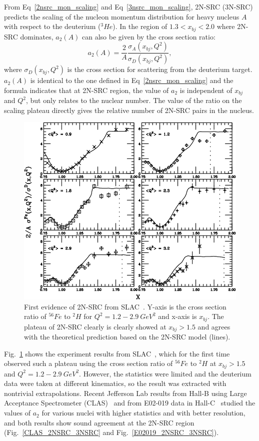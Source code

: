 From Eq~\eqref{2nsrc_mon_scaling} and Eq~\eqref{3nsrc_mon_scaling}, 2N-SRC (3N-SRC) predicts the scaling of the nucleon momentum distribution for heavy nucleus $A$ with respect to the deuterium ($^{3}He$). In the region of $1.3<x_{bj}<2.0$ where 2N-SRC dominates, $a_{2}(A)$ can also be given by the cross section ratio:
\begin{equation}
  a_{2}(A) = \frac{2}{A}\frac{\sigma_{A}(x_{bj},Q^{2})}{\sigma_{D}(x_{bj},Q^{2})},
  \label{src_a2}
\end{equation}
where $\sigma_{D}(x_{bj},Q^{2})$ is the cross section for scattering from the deuterium target. $a_{2}(A)$ is identical to the one defined in Eq~\eqref{2nsrc_mon_scaling} and the formula indicates that at 2N-SRC region, the value of $a_{2}$ is independent of $x_{bj}$ and $Q^{2}$, but only relates to the nuclear number. The value of the ratio on the scaling plateau directly gives the relative number of 2N-SRC pairs in the nucleus.
\begin{figure}[!ht]
  \begin{center}
    \includegraphics[type=pdf,ext=.pdf,read=.pdf,width=0.60\linewidth]{./figures/physics/SLAC_2NSRC_First}
    \caption[First evidence of 2N-SRC from SLAC]{\footnotesize{First evidence of 2N-SRC from SLAC~\cite{SLAC_Measurement_PRC.48.2451}. Y-axis is the cross section ratio of $^{56}Fe$ to $^{2}H$ for $Q^{2}=1.2-2.9~GeV^{2}$ and x-axis is $x_{bj}$. The plateau of 2N-SRC clearly is clearly showed at $x_{bj}>1.5$ and agrees with the theoretical prediction based on the 2N-SRC model (lines).}}
    \label{slac_2nsrc_first}
  \end{center}
\end{figure}

Fig.~\ref{slac_2nsrc_first} shows the experiment results from SLAC~\cite{SLAC_Measurement_PRC.48.2451}, which for the first time observed such a plateau using the cross section ratio of $^{56}Fe$ to $^{2}H$ at $x_{bj}>1.5$ and $Q^{2}=1.2-2.9~GeV^{2}$. However, the statistics were limited and the deuterium data were taken at different kinematics, so the result was extracted with nontrivial extrapolations. Recent Jefferson Lab results from Hall-B using Large Acceptance Spectrometer (CLAS)~\cite{PhysRevLett.96.082501} and from E02-019 data in Hall-C~\cite{PhysRevLett.108.092502} studied the values of $a_{2}$ for various nuclei with higher statistics and with better resolution, and both results show sound agreement at the 2N-SRC region (Fig.~\ref{CLAS_2NSRC_3NSRC} and Fig.~\ref{E02019_2NSRC_3NSRC}). 

